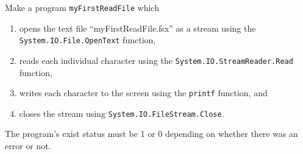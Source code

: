 Make a program \lstinline{myFirstReadFile} which
\begin{enumerate}
\item opens the text file ``myFirstReadFile.fsx'' as a stream using the
  \lstinline{System.IO.File.OpenText} function,
\item reads each individual character using the
  \lstinline{System.IO.StreamReader.Read} function,
\item writes each character to the screen using the \lstinline{printf}
  function, and
\item closes the stream using \lstinline{System.IO.FileStream.Close}.
\end{enumerate}
The program's exist status must be 1 or 0 depending on whether there
was an error or not.
